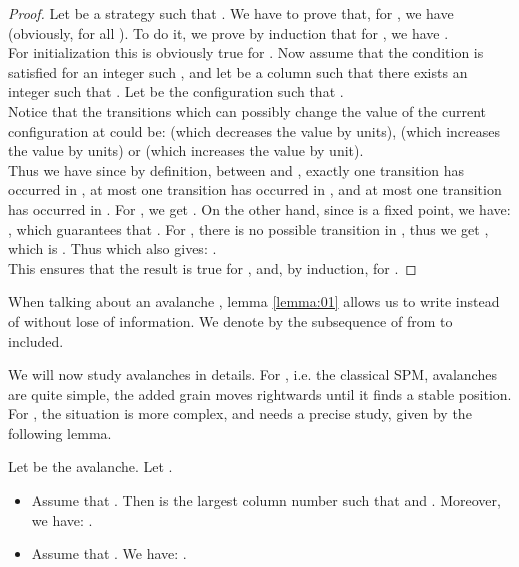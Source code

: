 \documentclass[11pt,a4paper]{llncs}
\begin{document}
\begin{proof}
  Let  be a strategy such that  . We have to  prove  that, for  
  , we have  (obviously,  for all ). To do it,  we prove by induction  that for
, we have .\\ 
  For initialization this is obviously true for . 
   Now assume that the condition is satisfied for an integer  such , and let  be a column such that there exists an integer  such that . Let   be the  configuration such that .\\
  Notice that the transitions which can possibly change the value of the current configuration at  could be:  (which decreases the value by  units),  (which increases the value by  units) or   (which increases the value by  unit).\\
  Thus we have  since by definition,  between    and , exactly one transition has occurred in   , at most one transition has occurred in , and at most one transition has occurred in . For , we get . On the other hand, since  is a fixed point, we have:   ,  which guarantees that . For , there is no possible transition in , thus we get , which is  . Thus     which also gives: .\\
  This ensures that the result is true for ,  and,  by induction,  for . 
\end{proof}

When talking about an avalanche , lemma \ref{lemma:01} allows us to write  instead of  without lose of information. We denote by    the  subsequence of  from   to  included.

We will now study avalanches in details. For , i.e.  the classical SPM, avalanches are quite simple, the added grain moves rightwards until it finds a stable position. For , the situation is more complex, and needs a precise study, given by the following lemma.  


\begin{lemma}\label{lemma:localdensity}
Let  be the  avalanche. Let .
\begin{itemize}
\item Assume that .  Then   is the largest column number  such that  and . Moreover,  we have: .
\item Assume that . We have:  .
\end{itemize}

\end{lemma}
\end{document}
